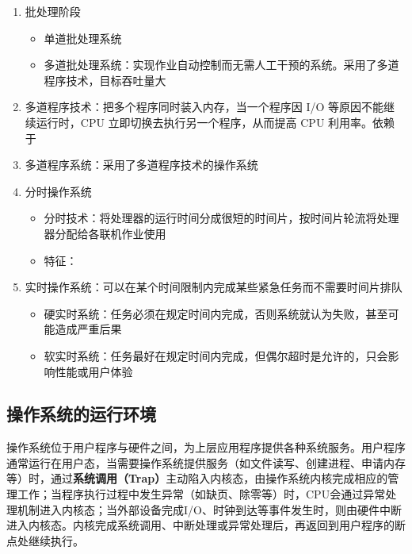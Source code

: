 \documentclass[./operating-systems.tex]{subfiles}
\begin{document}
    \begin{enumerate}
        \item 批处理阶段
        \begin{itemize}
            \item 单道批处理系统
            \item 多道批处理系统：实现作业自动控制而无需人工干预的系统。采用了多道程序技术，目标吞吐量大
        \end{itemize}
        \item 多道程序技术：把多个程序同时装入内存，当一个程序因 I/O 等原因不能继续运行时，CPU 立即切换去执行另一个程序，从而提高 CPU 利用率。依赖于{\color{red}{中断技术}}
        \item 多道程序系统：采用了多道程序技术的操作系统
        \item 分时操作系统
        \begin{itemize}
            \item 分时技术：将处理器的运行时间分成很短的时间片，按时间片轮流将处理器分配给各联机作业使用
            \item 特征：
        \end{itemize}
        \item 实时操作系统：可以在某个时间限制内完成某些紧急任务而不需要时间片排队
        \begin{itemize}
            \item 硬实时系统：任务必须在规定时间内完成，否则系统就认为失败，甚至可能造成严重后果
            \item 软实时系统：任务最好在规定时间内完成，但偶尔超时是允许的，只会影响性能或用户体验
        \end{itemize}
    \end{enumerate}

    \subsection{操作系统的运行环境}

    操作系统位于用户程序与硬件之间，为上层应用程序提供各种系统服务。用户程序通常运行在用户态，当需要操作系统提供服务（如文件读写、创建进程、申请内存等）时，通过\textbf{系统调用（Trap）}主动陷入内核态，由操作系统内核完成相应的管理工作；当程序执行过程中发生异常（如缺页、除零等）时，CPU会通过异常处理机制进入内核态；当外部设备完成I/O、时钟到达等事件发生时，则由硬件中断进入内核态。内核完成系统调用、中断处理或异常处理后，再返回到用户程序的断点处继续执行。
\end{document}
